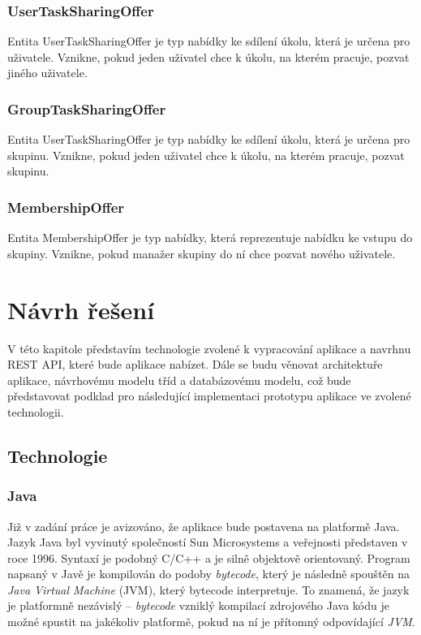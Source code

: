 \documentclass[thesis=B,czech]{FITthesis}[2012/06/26]
\begin{document}
		\subsection{UserTaskSharingOffer}
			Entita UserTaskSharingOffer je typ nabídky ke sdílení úkolu, která je určena pro uživatele. Vznikne, pokud jeden uživatel chce k úkolu, na kterém pracuje, pozvat jiného uživatele.
		
		\subsection{GroupTaskSharingOffer}
			Entita UserTaskSharingOffer je typ nabídky ke sdílení úkolu, která je určena pro skupinu. Vznikne, pokud jeden uživatel chce k úkolu, na kterém pracuje, pozvat skupinu.
		
		\subsection{MembershipOffer}
			Entita MembershipOffer je typ nabídky, která reprezentuje nabídku ke vstupu do skupiny. Vznikne, pokud manažer skupiny do ní chce pozvat nového uživatele.
		
	

\chapter{Návrh řešení}
	\label{chapter:design}
	
	V této kapitole představím technologie zvolené k vypracování aplikace a navrhnu REST API, které bude aplikace nabízet. Dále se budu věnovat architektuře aplikace, návrhovému modelu tříd a databázovému modelu, což bude představovat podklad pro následující implementaci prototypu aplikace ve zvolené technologii.

	\section{Technologie}
	
		\subsection{Java}
			Již v zadání práce je avizováno, že aplikace bude postavena na platformě Java. \cite{java} Jazyk Java byl vyvinutý společností Sun Microsystems a veřejnosti představen v roce 1996. Syntaxí je podobný C/C++ a je silně objektově orientovaný. Program napsaný v Javě je kompilován do podoby \textit{bytecode}, který je následně spouštěn na \textit{Java Virtual Machine} (JVM), který bytecode interpretuje. To znamená, že jazyk je platformně nezávislý -- \textit{bytecode} vzniklý kompilací zdrojového Java kódu je možné spustit na jakékoliv platformě, pokud na ní je přítomný odpovídající \textit{JVM}. 
			
\end{document}
